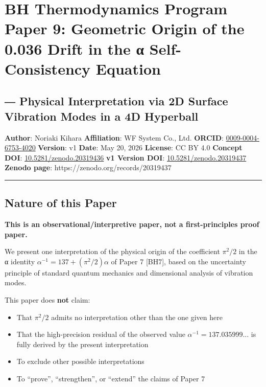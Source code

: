 \documentclass[
  11pt]{article}
\author{}
\date{}
\providecommand{\tightlist}{%
  \setlength{\itemsep}{0pt}\setlength{\parskip}{0pt}}
\begin{document}
\section{BH Thermodynamics Program Paper 9: Geometric Origin of the
0.036 Drift in the α Self-Consistency
Equation}\label{bh-thermodynamics-program-paper-9-geometric-origin-of-the-0.036-drift-in-the-ux3b1-self-consistency-equation}

\subsection{― Physical Interpretation via 2D Surface Vibration Modes in
a 4D
Hyperball}\label{physical-interpretation-via-2d-surface-vibration-modes-in-a-4d-hyperball}

\textbf{Author}: Noriaki Kihara \textbf{Affiliation}: WF System Co.,
Ltd. \textbf{ORCID}:
\href{https://orcid.org/0009-0004-6753-4020}{0009-0004-6753-4020}
\textbf{Version}: v1 \textbf{Date}: May 20, 2026 \textbf{License}: CC BY
4.0 \textbf{Concept DOI}:
\href{https://doi.org/10.5281/zenodo.20319436}{10.5281/zenodo.20319436}
\textbf{v1 Version DOI}:
\href{https://doi.org/10.5281/zenodo.20319437}{10.5281/zenodo.20319437}
\textbf{Zenodo page}: https://zenodo.org/records/20319437

\begin{center}\rule{0.5\linewidth}{0.5pt}\end{center}

\subsection{Nature of this Paper}\label{nature-of-this-paper}

\textbf{This is an observational/interpretive paper, not a
first-principles proof paper.}

We present one interpretation of the physical origin of the coefficient
\(\pi^2/2\) in the α identity \(\alpha^{-1} = 137 + (\pi^2/2)\alpha\) of
Paper 7 {[}BH7{]}, based on the uncertainty principle of standard
quantum mechanics and dimensional analysis of vibration modes.

This paper does \textbf{not} claim:

\begin{itemize}
\tightlist
\item
  That \(\pi^2/2\) admits no interpretation other than the one given
  here
\item
  That the high-precision residual of the observed value
  \(\alpha^{-1} = 137.035999...\) is fully derived by the present
  interpretation
\item
  To exclude other possible interpretations
\item
  To ``prove'', ``strengthen'', or ``extend'' the claims of Paper 7
\end{itemize}
\end{document}
